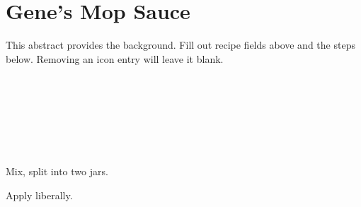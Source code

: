 \section[Gene's Mop]{Gene's Mop Sauce}

\begin{recipestats}[
        servings=24~$\fluidounce$,
        preptime=15~$\minute$,
        source=Gene VenMeter,
    ]
\end{recipestats}

\begin{recipeabstract}
    This abstract provides the background.
    Fill out recipe fields above and the steps below.
    Removing an icon entry will leave it blank.
\end{recipeabstract}

\begin{ingredientcolumns}
    \begin{ingredientblock}
        \\
        \\
        \\
    \end{ingredientblock}
    \begin{ingredientblock}
        \\
        \\
    \end{ingredientblock}
\end{ingredientcolumns}

\begin{preparation}
\item Mix, split into two jars.
\item Apply liberally.
\end{preparation}

\recipeend%
